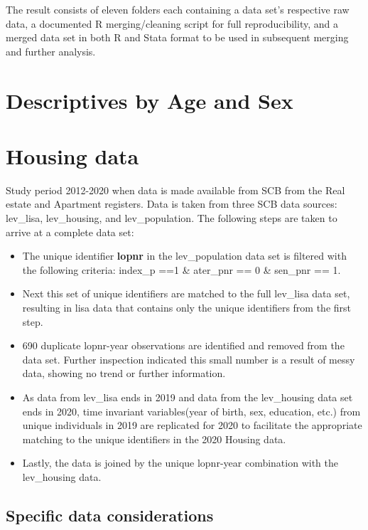\documentclass[
]{book}
\begin{document}
The result consists of eleven folders each containing a data set's respective raw data, a documented R merging/cleaning script for full reproducibility, and a merged data set in both R and Stata format to be used in subsequent merging and further analysis.

\hypertarget{descriptives-by-age-and-sex}{%
\chapter{Descriptives by Age and Sex}\label{descriptives-by-age-and-sex}}

\hypertarget{housing-data}{%
\chapter{Housing data}\label{housing-data}}

Study period 2012-2020 when data is made available from SCB from the Real estate and Apartment registers. Data is taken from three SCB data sources: lev\_lisa, lev\_housing, and lev\_population. The following steps are taken to arrive at a complete data set:

\begin{itemize}
\item
  The unique identifier \textbf{lopnr} in the lev\_population data set is filtered with the following criteria: index\_p ==1 \& ater\_pnr == 0 \& sen\_pnr == 1.
\item
  Next this set of unique identifiers are matched to the full lev\_lisa data set, resulting in lisa data that contains only the unique identifiers from the first step.
\item
  690 duplicate lopnr-year observations are identified and removed from the data set. Further inspection indicated this small number is a result of messy data, showing no trend or further information.
\item
  As data from lev\_lisa ends in 2019 and data from the lev\_housing data set ends in 2020, time invariant variables(year of birth, sex, education, etc.) from unique individuals in 2019 are replicated for 2020 to facilitate the appropriate matching to the unique identifiers in the 2020 Housing data.
\item
  Lastly, the data is joined by the unique lopnr-year combination with the lev\_housing data.
\end{itemize}

\hypertarget{specific-data-considerations}{%
\section{Specific data considerations}\label{specific-data-considerations}}
\end{document}
